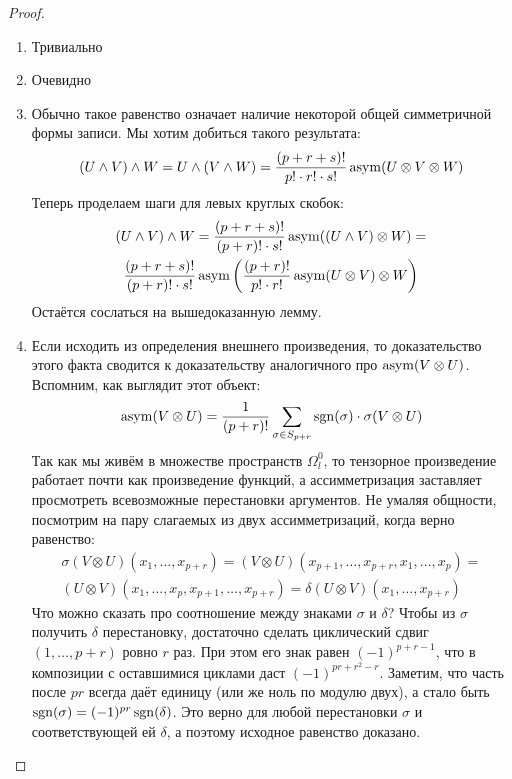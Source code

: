 \begin{proof}~
	\begin{enumerate}
		\item Тривиально
		
		\item Очевидно
		
		\item Обычно такое равенство означает наличие некоторой общей симметричной формы записи. Мы хотим добиться такого результата:
		\[
		(U \wedge V) \wedge W = U \wedge (V \wedge W) = \frac{(p + r + s)!}{p! \cdot r! \cdot s!} \operatorname{asym}(U \otimes V \otimes W)
		\]
		Теперь проделаем шаги для левых круглых скобок:
		\begin{multline*}
		(U \wedge V) \wedge W = \frac{(p + r + s)!}{(p + r)! \cdot s!} \operatorname{asym}((U \wedge V) \otimes W) =
		\\
		\frac{(p + r + s)!}{(p + r)! \cdot s!} \operatorname{asym}\left(\frac{(p + r)!}{p! \cdot r!} \operatorname{asym}(U \otimes V) \otimes W\right)
		\end{multline*}
		Остаётся сослаться на вышедоказанную лемму.
		
		\item Если исходить из определения внешнего произведения, то доказательство этого факта сводится к доказательству аналогичного про $\operatorname{asym}(V \otimes U)$. Вспомним, как выглядит этот объект:
		\[
		\operatorname{asym}(V \otimes U) = \frac{1}{(p + r)!} \sum_{\sigma \in S_{p + r}} \operatorname{sgn}(\sigma) \cdot \sigma (V \otimes U)
		\]
		Так как мы живём в множестве пространств $\Omega_l^0$, то тензорное произведение работает почти как произведение функций, а ассимметризация заставляет просмотреть всевозможные перестановки аргументов. Не умаляя общности, посмотрим на пару слагаемых из двух ассимметризаций, когда верно равенство:
		\begin{multline*}
		\sigma(V \otimes U)(x_1, \ldots, x_{p + r}) = (V \otimes U)(x_{p + 1}, \ldots, x_{p + r}, x_1, \ldots, x_p) =
		\\
		(U \otimes V)(x_1, \ldots, x_p, x_{p + 1}, \ldots, x_{p + r}) = \delta(U \otimes V)(x_1, \ldots, x_{p + r})
		\end{multline*}
		Что можно сказать про соотношение между знаками $\sigma$ и $\delta$? Чтобы из $\sigma$ получить $\delta$ перестановку, достаточно сделать циклический сдвиг $(1, \ldots, p + r)$ ровно $r$ раз. При этом его знак равен $(-1)^{p + r - 1}$, что в композиции с оставшимися циклами даст $(-1)^{pr + r^2 - r}$. Заметим, что часть после $pr$ всегда даёт единицу (или же ноль по модулю двух), а стало быть $\operatorname{sgn}(\sigma) = (-1)^{pr} \operatorname{sgn}(\delta)$. Это верно для любой перестановки $\sigma$ и соответствующей ей $\delta$, а поэтому исходное равенство доказано.
	\end{enumerate}
\end{proof}

